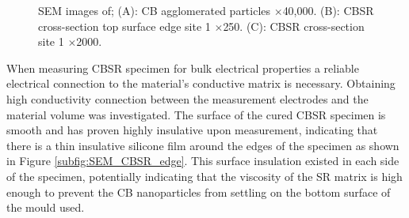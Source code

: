 \begin{figure}[H]
	\centering
    \begin{minipage}[t]{\textwidth}
		\centering
		\hspace{0.4cm}
	\end{minipage}
    \begin{minipage}[t]{\textwidth}
		\centering
		\vspace{0.4cm}
	\end{minipage}
	\caption{SEM images of; (A): CB agglomerated particles $\times$40,000. (B): CBSR cross-section top surface edge site 1 $\times$250. (C): CBSR cross-section site 1 $\times$2000.}
	\label{fig:SEM_CB_SR}
\end{figure}
When measuring CBSR specimen for bulk electrical properties a reliable electrical connection to the material's conductive matrix is necessary. Obtaining high conductivity connection between the measurement electrodes and the material volume was investigated. The surface of the cured CBSR specimen is smooth and has proven highly insulative upon measurement, indicating that there is a thin insulative silicone film around the edges of the specimen as shown in Figure \ref{subfig:SEM_CBSR_edge}. This surface insulation existed in each side of the specimen, potentially indicating that the viscosity of the SR matrix is high enough to prevent the CB nanoparticles from settling on the bottom surface of the mould used.

